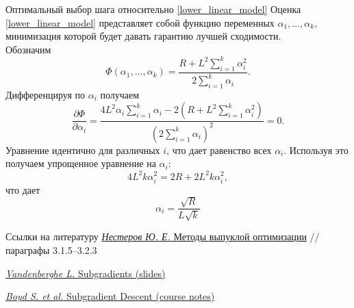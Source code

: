 \documentclass[10pt, handout]{beamer}
\begin{document}
\begin{frame}{Оптимальный выбор шага относительно \eqref{lower_linear_model}}
Оценка \eqref{lower_linear_model} представляет собой функцию переменных $\alpha_1, \ldots, \alpha_k$, минимизация
которой будет давать гарантию лучшей сходимости.\\
\pause
\vspace{1em}
Обозначим
$$
\Phi(\alpha_1, \ldots, \alpha_k)=\frac{R+L^2\sum_{i=1}^k\alpha_i^2}{2\sum_{i=1}^k\alpha_i}.
$$
\pause
Дифференцируя по $\alpha_i$ получаем
$$
\frac{\partial \Phi}{\partial \alpha_i}=\frac{4L^2\alpha_i\sum_{i=1}^k\alpha_i-2(R+L^2\sum_{i=1}^k\alpha_i^2)}{(2\sum_{i=1}^k\alpha_i)^2}=0.
$$
\pause
Уравнение идентично для различных $i$, что дает равенство всех $\alpha_i$. Используя это получаем упрощенное уравнение на $\alpha_i$:
$$
4L^2k\alpha_i^2=2R+2L^2k\alpha_i^2,
$$
что дает
$$
\alpha_i=\frac{\sqrt{R}}{L\sqrt{k}}
$$

\end{frame}

\begin{frame}{Ссылки на литературу}
\href{http://premolab.ru/pub_files/pub5/MnexoB89z7.pdf}{\textit{Нестеров Ю. Е.} Методы выпуклой оптимизации}
 // параграфы 3.1.5--3.2.3\\
 \vspace{1em}

\href{http://www.seas.ucla.edu/~vandenbe/236C/lectures/subgradients.pdf}{\textit{Vandenberghe L.} Subgradients (slides)}\\
\vspace{1em}

\href{https://web.stanford.edu/class/ee392o/subgrad_method.pdf}{\textit{Boyd S. et al.} Subgradient Descent (course notes)}


\end{frame}
\end{document}
